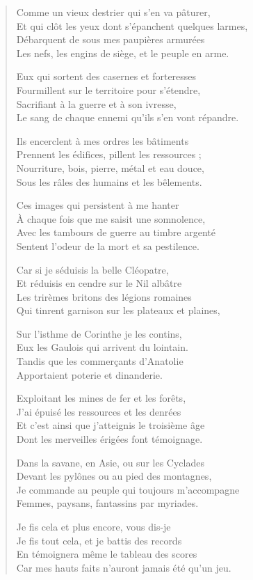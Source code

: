 \begin{verse}
Comme un vieux destrier qui s’en va pâturer,\\
Et qui clôt les yeux dont s’épanchent quelques larmes,\\
Débarquent de sous mes paupières armurées\\
Les nefs, les engins de siège, et le peuple en arme.

Eux qui sortent des casernes et forteresses\\
Fourmillent sur le territoire pour s’étendre,\\
Sacrifiant à la guerre et à son ivresse,\\
Le sang de chaque ennemi qu’ils s’en vont répandre.

Ils encerclent à mes ordres les bâtiments\\
Prennent les édifices, pillent les ressources ;\\
Nourriture, bois, pierre, métal et eau douce,\\
Sous les râles des humains et les bêlements.

Ces images qui persistent à me hanter\\
À chaque  fois que me saisit une somnolence,\\
Avec les tambours de guerre au timbre argenté\\
Sentent l’odeur de la mort et sa pestilence.

Car si je séduisis la belle Cléopatre,\\
Et réduisis en cendre sur le Nil albâtre\\
Les trirèmes britons des légions romaines\\
Qui tinrent garnison sur les plateaux et plaines,

Sur l’isthme de Corinthe je les contins,\\
Eux les Gaulois qui arrivent du lointain.\\
Tandis que les commerçants d’Anatolie\\
Apportaient poterie et dinanderie.

Exploitant les mines de fer et  les forêts,\\
J’ai épuisé les ressources et les denrées\\
Et c’est ainsi que j’atteignis le troisième âge\\
Dont les merveilles érigées font témoignage.

Dans la savane, en Asie, ou sur les Cyclades\\
Devant les pylônes ou au pied des montagnes,\\
Je commande au peuple qui toujours m’accompagne\\
Femmes, paysans, fantassins par myriades.

Je fis cela et plus encore, vous dis-je\\
Je fis tout cela, et je battis  des records\\
En témoignera même le tableau  des scores\\
Car mes hauts faits n’auront jamais été qu’un jeu.
\end{verse}

